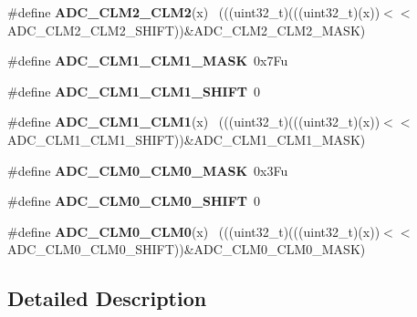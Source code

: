 \begin{DoxyCompactItemize}
\item 
\hypertarget{group___a_d_c___register___masks_gaf9fff8bc3bc10df6ad470c1440f527d0}{}\#define {\bfseries A\+D\+C\+\_\+\+C\+L\+M2\+\_\+\+C\+L\+M2}(x)                                              ~(((uint32\+\_\+t)(((uint32\+\_\+t)(x))$<$$<$A\+D\+C\+\_\+\+C\+L\+M2\+\_\+\+C\+L\+M2\+\_\+\+S\+H\+I\+F\+T))\&A\+D\+C\+\_\+\+C\+L\+M2\+\_\+\+C\+L\+M2\+\_\+\+M\+A\+S\+K)\label{group___a_d_c___register___masks_gaf9fff8bc3bc10df6ad470c1440f527d0}

\item 
\hypertarget{group___a_d_c___register___masks_gaf576a4eb27b1478ea37a1b35bf6b869f}{}\#define {\bfseries A\+D\+C\+\_\+\+C\+L\+M1\+\_\+\+C\+L\+M1\+\_\+\+M\+A\+S\+K}~0x7\+Fu\label{group___a_d_c___register___masks_gaf576a4eb27b1478ea37a1b35bf6b869f}

\item 
\hypertarget{group___a_d_c___register___masks_gae83765be6a54aab249c89a0f47afb023}{}\#define {\bfseries A\+D\+C\+\_\+\+C\+L\+M1\+\_\+\+C\+L\+M1\+\_\+\+S\+H\+I\+F\+T}~0\label{group___a_d_c___register___masks_gae83765be6a54aab249c89a0f47afb023}

\item 
\hypertarget{group___a_d_c___register___masks_ga4330bea003d35f36729b166bef5468c6}{}\#define {\bfseries A\+D\+C\+\_\+\+C\+L\+M1\+\_\+\+C\+L\+M1}(x)                                              ~(((uint32\+\_\+t)(((uint32\+\_\+t)(x))$<$$<$A\+D\+C\+\_\+\+C\+L\+M1\+\_\+\+C\+L\+M1\+\_\+\+S\+H\+I\+F\+T))\&A\+D\+C\+\_\+\+C\+L\+M1\+\_\+\+C\+L\+M1\+\_\+\+M\+A\+S\+K)\label{group___a_d_c___register___masks_ga4330bea003d35f36729b166bef5468c6}

\item 
\hypertarget{group___a_d_c___register___masks_ga2f9f36fb3b4eceab2198582865dc5b14}{}\#define {\bfseries A\+D\+C\+\_\+\+C\+L\+M0\+\_\+\+C\+L\+M0\+\_\+\+M\+A\+S\+K}~0x3\+Fu\label{group___a_d_c___register___masks_ga2f9f36fb3b4eceab2198582865dc5b14}

\item 
\hypertarget{group___a_d_c___register___masks_gaf5a5fd710a47f83c5ee3fd083f430a66}{}\#define {\bfseries A\+D\+C\+\_\+\+C\+L\+M0\+\_\+\+C\+L\+M0\+\_\+\+S\+H\+I\+F\+T}~0\label{group___a_d_c___register___masks_gaf5a5fd710a47f83c5ee3fd083f430a66}

\item 
\hypertarget{group___a_d_c___register___masks_gaec2ba4c82cc108145d5e6263fbc44bc1}{}\#define {\bfseries A\+D\+C\+\_\+\+C\+L\+M0\+\_\+\+C\+L\+M0}(x)                                              ~(((uint32\+\_\+t)(((uint32\+\_\+t)(x))$<$$<$A\+D\+C\+\_\+\+C\+L\+M0\+\_\+\+C\+L\+M0\+\_\+\+S\+H\+I\+F\+T))\&A\+D\+C\+\_\+\+C\+L\+M0\+\_\+\+C\+L\+M0\+\_\+\+M\+A\+S\+K)\label{group___a_d_c___register___masks_gaec2ba4c82cc108145d5e6263fbc44bc1}

\end{DoxyCompactItemize}


\subsection{Detailed Description}
